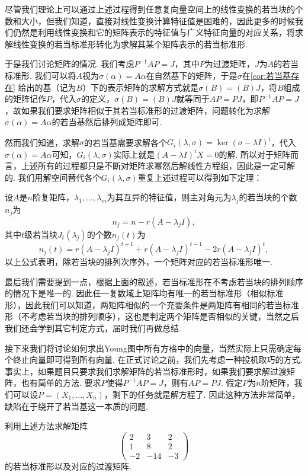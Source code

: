 尽管我们理论上可以通过上述过程得到任意复向量空间上的线性变换的若当块的个数和大小，但我们知道，直接对线性变换计算特征值是困难的，因此更多的时候我们仍然是利用线性变换和它的矩阵表示的特征值与广义特征向量的对应关系，将求解线性变换的若当标准形转化为求解其某个矩阵表示的若当标准形.

于是我们讨论矩阵的情况. 我们考虑$P^{-1}AP=J$，其中$P$为过渡矩阵，$J$为$A$的若当标准形. 我们可以将$A$视为$\sigma(\alpha)=A\alpha$在自然基下的矩阵，于是$\sigma$在\autoref{cor:若当基存在} 给出的基（记为$B$）下的表示矩阵的求解方式就是$\sigma(B)=(B)J$，将$B$组成的矩阵记作$P$，代入$\sigma$的定义，$\sigma(B)=(B)J$就等同于$AP=PJ$，即$P^{-1}AP=J$，故如果我们要求矩阵相似于其若当标准形的过渡矩阵，问题转化为求解$\sigma(\alpha)=A\alpha$的若当基然后排列成矩阵即可.

然而我们知道，求解$\sigma$的若当基需要求解各个$G_i(\lambda,\sigma)=\ker(\sigma-\lambda I)^i$，代入$\sigma(\alpha)=A\alpha$可知，$G_i(\lambda,\sigma)$实际上就是$(A-\lambda I)^iX=0$的解. 所以对于矩阵而言，上述所有的过程都只是不断对矩阵求幂然后解线性方程组，因此是一定可解的. 我们用解空间替代各个$G_i(\lambda,\sigma)$重复上述过程可以得到如下定理：
\begin{theorem}{}{}
    设$A$是$n$阶复矩阵，$\lambda_1,\ldots,\lambda_m$为其互异的特征值，则主对角元为$\lambda_j$的若当块的个数$n_j$为
    \begin{equation} \label{eq:17:矩阵若当块个数}
        n_j=n-r(A-\lambda_j I),
    \end{equation}
    其中$t$级若当块$J_t(\lambda_j)$的个数$n_j(t)$为
    \begin{equation} \label{eq:17:矩阵若当块大小}
        n_j(t)=r(A-\lambda_j I)^{t+1}+r(A-\lambda_j I)^{t-1}-2r(A-\lambda_j I)^t,
    \end{equation}
    以上公式表明，除若当块的排列次序外，一个矩阵对应的若当标准形唯一.
\end{theorem}

最后我们需要提到一点，根据上面的叙述，若当标准形在不考虑若当块的排列顺序的情况下是唯一的. 因此任一复数域上矩阵均有唯一的若当标准形（相似标准形），因此我们可以知道，两矩阵相似的一个充要条件是两矩阵有相同的若当标准形（不考虑若当块的排列顺序），这也是判定两个矩阵是否相似的关键，当然之后我们还会学到其它判定方式，届时我们再做总结.

接下来我们将讨论如何求出Young图中所有方格中的向量，当然实际上只需确定每个终止向量即可得到所有向量. 在正式讨论之前，我们先考虑一种投机取巧的方式. 事实上，如果题目只要求我们求解矩阵的若当标准形时，如果我们要求解过渡矩阵，也有简单的方法. 要求$P$使得$P^{-1}AP=J$，则有$AP=PJ$. 假定$P$为$n$阶矩阵，我们可以设$P=(X_1,\ldots,X_n)$，剩下的任务就是解方程了. 因此这种方法非常简单，缺陷在于绕开了若当基这一本质的问题.
\begin{example}{}{}
    利用上述方法求解矩阵\[\begin{pmatrix}
            2 & 3 & 2 \\ 1 & 8 & 2 \\ -2 & -14 & -3
        \end{pmatrix}\]的若当标准形以及对应的过渡矩阵.
\end{example}

